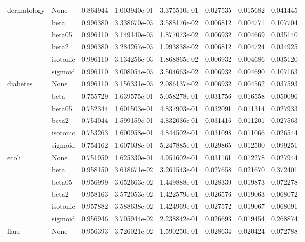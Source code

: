 \begin{tabular}{llrrrrrr}
dermatology & None &  0.864944 &  1.003940e-01 &  3.375510e-01 &  0.027535 &  0.015682 &  0.041445 \\
        & beta &  0.996380 &  3.338670e-03 &  3.588176e-02 &  0.006812 &  0.004771 &  0.107704 \\
        & beta05 &  0.996110 &  3.149140e-03 &  1.877073e-02 &  0.006932 &  0.004669 &  0.035140 \\
        & beta2 &  0.996380 &  3.284267e-03 &  1.993838e-02 &  0.006812 &  0.004724 &  0.034925 \\
        & isotonic &  0.996110 &  3.134256e-03 &  1.868865e-02 &  0.006932 &  0.004686 &  0.035120 \\
        & sigmoid &  0.996110 &  3.008054e-03 &  3.504663e-02 &  0.006932 &  0.004690 &  0.107163 \\
diabetes & None &  0.996110 &  3.156331e-03 &  2.086137e-02 &  0.006932 &  0.004562 &  0.037593 \\
        & beta &  0.755729 &  1.639575e-01 &  5.058278e-01 &  0.031756 &  0.016558 &  0.050096 \\
        & beta05 &  0.752344 &  1.601503e-01 &  4.837903e-01 &  0.032091 &  0.011314 &  0.027933 \\
        & beta2 &  0.754044 &  1.599159e-01 &  4.832036e-01 &  0.031416 &  0.011201 &  0.027563 \\
        & isotonic &  0.753263 &  1.600958e-01 &  4.844502e-01 &  0.031098 &  0.011066 &  0.026544 \\
        & sigmoid &  0.754162 &  1.607038e-01 &  5.247885e-01 &  0.029865 &  0.012500 &  0.099251 \\
ecoli & None &  0.751959 &  1.625330e-01 &  4.951602e-01 &  0.031161 &  0.012278 &  0.027944 \\
        & beta &  0.958150 &  3.618671e-02 &  3.261543e-01 &  0.027658 &  0.021670 &  0.372401 \\
        & beta05 &  0.956999 &  3.652663e-02 &  1.449888e-01 &  0.028339 &  0.019873 &  0.072278 \\
        & beta2 &  0.958163 &  3.572053e-02 &  1.422579e-01 &  0.026576 &  0.019063 &  0.068072 \\
        & isotonic &  0.957882 &  3.588638e-02 &  1.424969e-01 &  0.027572 &  0.019067 &  0.068091 \\
        & sigmoid &  0.956946 &  3.705944e-02 &  2.238842e-01 &  0.026693 &  0.019454 &  0.268874 \\
flare & None &  0.956393 &  3.726021e-02 &  1.590250e-01 &  0.028634 &  0.020424 &  0.072788 \\

\end{tabular}
